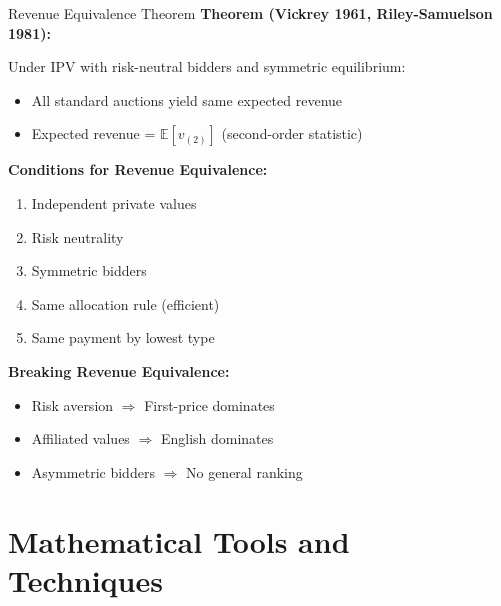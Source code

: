 \documentclass[xcolor={x11names}]{beamer}
\begin{document}
\begin{frame}{Revenue Equivalence Theorem}
\textbf{Theorem (Vickrey 1961, Riley-Samuelson 1981):}

Under IPV with risk-neutral bidders and symmetric equilibrium:
\begin{itemize}
  \item All standard auctions yield same expected revenue
  \item Expected revenue = $\mathbb{E}[v_{(2)}]$ (second-order statistic)
\end{itemize}


\textbf{Conditions for Revenue Equivalence:}
\begin{enumerate}
  \item Independent private values
  \item Risk neutrality
  \item Symmetric bidders
  \item Same allocation rule (efficient)
  \item Same payment by lowest type
\end{enumerate}


\textbf{Breaking Revenue Equivalence:}
\begin{itemize}
  \item Risk aversion $\Rightarrow$ First-price dominates
  \item Affiliated values $\Rightarrow$ English dominates
  \item Asymmetric bidders $\Rightarrow$ No general ranking
\end{itemize}
\end{frame}

\section{Mathematical Tools and Techniques}
\end{document}
